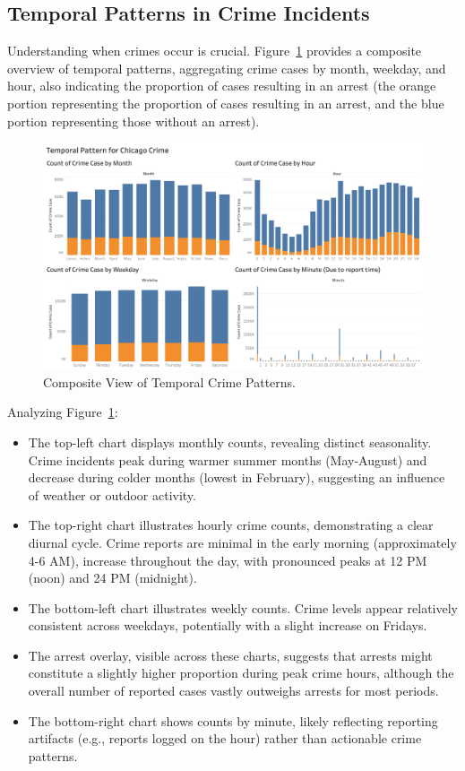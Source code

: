 \documentclass[11pt]{article}
\begin{document}
\subsection{Temporal Patterns in Crime Incidents}
\label{subsec:temporal_patterns}
Understanding when crimes occur is crucial. Figure~\ref{fig:chart_time} provides a composite overview of temporal patterns, aggregating crime cases by month, weekday, and hour, also indicating the proportion of cases resulting in an arrest (the orange portion representing the proportion of cases resulting in an arrest, and the blue portion representing those without an arrest).

\begin{figure}[htbp]
    \centering
    \includegraphics[width=\textwidth]{chart_time.png}
    \caption{Composite View of Temporal Crime Patterns.}
    \label{fig:chart_time}
\end{figure}

Analyzing Figure~\ref{fig:chart_time}:
\begin{itemize}
    \item The top-left chart displays monthly counts, revealing distinct seasonality. Crime incidents peak during warmer summer months (May-August) and decrease during colder months (lowest in February), suggesting an influence of weather or outdoor activity.
    \item The top-right chart illustrates hourly crime counts, demonstrating a clear diurnal cycle. Crime reports are minimal in the early morning (approximately 4-6 AM), increase throughout the day, with pronounced peaks at 12 PM (noon) and 24 PM (midnight).
    \item The bottom-left chart illustrates weekly counts. Crime levels appear relatively consistent across weekdays, potentially with a slight increase on Fridays.
    \item The arrest overlay, visible across these charts, suggests that arrests might constitute a slightly higher proportion during peak crime hours, although the overall number of reported cases vastly outweighs arrests for most periods.
    \item The bottom-right chart shows counts by minute, likely reflecting reporting artifacts (e.g., reports logged on the hour) rather than actionable crime patterns.
\end{itemize}
\end{document}
